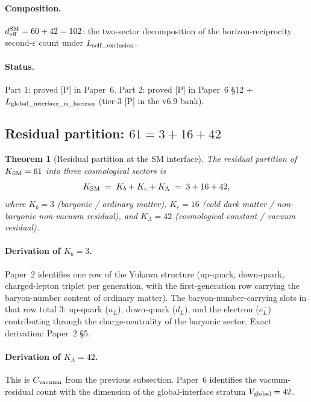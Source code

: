 \documentclass[11pt]{article}
\theoremstyle{plain}
\newtheorem{theorem}{Theorem}[section]
\theoremstyle{definition}
\theoremstyle{remark}
\begin{document}
\paragraph{Composition.}  $d_{\rm eff}^{\rm SM} = 60 + 42 = 102$: the two-sector decomposition of the horizon-reciprocity second-$\varepsilon$ count under $L_{\rm self\_exclusion}$.

\paragraph{Status.}  Part 1: proved [P] in Paper~6.  Part 2: proved [P] in Paper~6 \S12 + $L_{\rm global\_interface\_is\_horizon}$ (tier-3 [P] in the v6.9 bank).

\subsection{Residual partition: $61 = 3 + 16 + 42$}\label{supp:M4}

\begin{theorem}[Residual partition at the SM interface]\label{thm:residual_partition}
The residual partition of $K_{\rm SM} = 61$ into three cosmological sectors is
\[
  K_{\rm SM} \;=\; K_b + K_c + K_\Lambda \;=\; 3 + 16 + 42,
\]
where $K_b = 3$ (baryonic / ordinary matter), $K_c = 16$ (cold dark matter / non-baryonic non-vacuum residual), and $K_\Lambda = 42$ (cosmological constant / vacuum residual).
\end{theorem}

\paragraph{Derivation of $K_b = 3$.}  Paper~2 identifies one row of the Yukawa structure (up-quark, down-quark, charged-lepton triplet per generation, with the first-generation row carrying the baryon-number content of ordinary matter).  The baryon-number-carrying slots in that row total 3: up-quark ($u_L$), down-quark ($d_L$), and the electron ($e_L^{-}$) contributing through the charge-neutrality of the baryonic sector.  Exact derivation: Paper~2 \S5.

\paragraph{Derivation of $K_\Lambda = 42$.}  This is $C_{\rm vacuum}$ from the previous subsection.  Paper~6 identifies the vacuum-residual count with the dimension of the global-interface stratum $V_{\rm global} = 42$.
\end{document}
